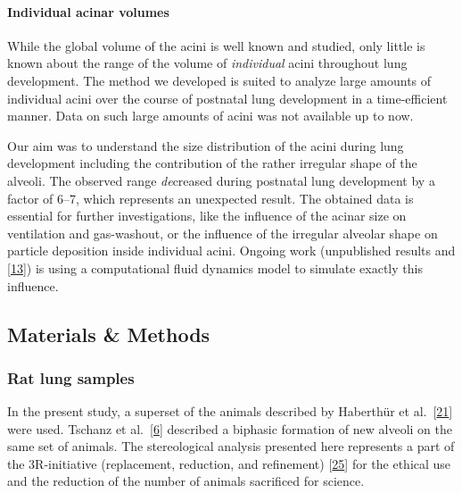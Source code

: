 \documentclass[
  american,
]{article}
\begin{document}
\hypertarget{individual-acinar-volumes}{%
\paragraph{Individual acinar volumes}\label{individual-acinar-volumes}}

While the global volume of the acini is well known and studied, only little is known about the range of the volume of \emph{individual} acini throughout lung development.
The method we developed is suited to analyze large amounts of individual acini over the course of postnatal lung development in a time-efficient manner.
Data on such large amounts of acini was not available up to now.

Our aim was to understand the size distribution of the acini during lung development including the contribution of the rather irregular shape of the alveoli.
The observed range \emph{de}creased during postnatal lung development by a factor of 6--7, which represents an unexpected result.
The obtained data is essential for further investigations, like the influence of the acinar size on ventilation and gas-washout, or the influence of the irregular alveolar shape on particle deposition inside individual acini.
Ongoing work (unpublished results and {[}\protect\hyperlink{ref-eb0gk6VO}{13}{]}) is using a computational fluid dynamics model to simulate exactly this influence.

\hypertarget{materials-methods}{%
\subsection{Materials \& Methods}\label{materials-methods}}

\hypertarget{rat-lung-samples}{%
\subsubsection{Rat lung samples}\label{rat-lung-samples}}

In the present study, a superset of the animals described by Haberthür et al.~{[}\protect\hyperlink{ref-7YLeeyu}{21}{]} were used.
Tschanz et al.~{[}\protect\hyperlink{ref-wnl86DEM}{6}{]} described a biphasic formation of new alveoli on the same set of animals.
The stereological analysis presented here represents a part of the 3R-initiative (replacement, reduction, and refinement) {[}\protect\hyperlink{ref-199ALtdJt}{25}{]} for the ethical use and the reduction of the number of animals sacrificed for science.
\end{document}
